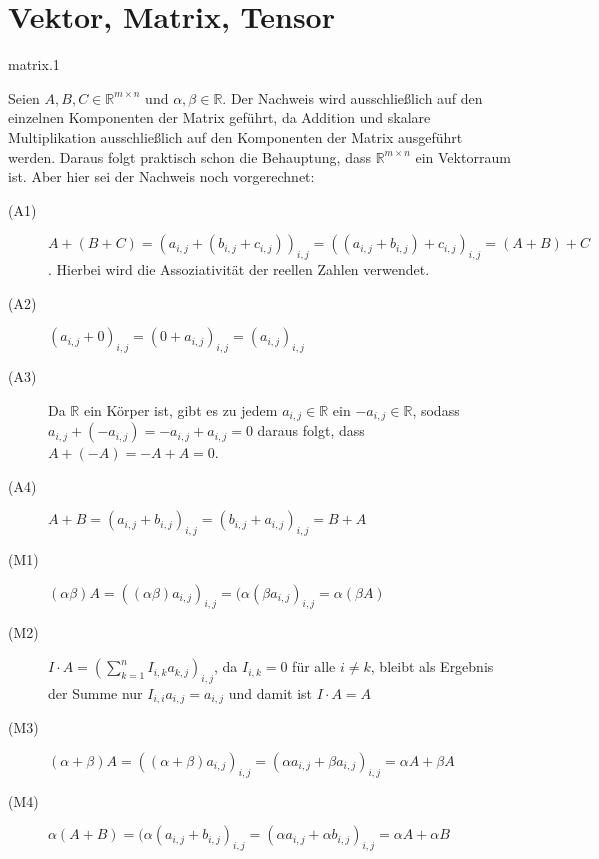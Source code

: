 \section{Vektor, Matrix, Tensor}

\begin{sol}{matrix.1}

Seien $A,B,C\in \mathbb{R}^{m\times n}$ und $\alpha , \beta \in \mathbb{R}$. Der Nachweis wird ausschließlich auf den einzelnen Komponenten der Matrix geführt, da Addition und skalare Multiplikation ausschließlich auf den Komponenten der Matrix ausgeführt werden. Daraus folgt praktisch schon die Behauptung, dass $\mathbb{R}^{m\times n}$ ein Vektorraum ist. Aber hier sei der Nachweis noch vorgerechnet:

\begin{description}
\item[(A1)] $A+(B+C) = (a_{i,j}+(b_{i,j}+c_{i,j}))_{i,j} = ((a_{i,j}+b_{i,j})+c_{i,j})_{i,j} = (A+B)+C$. Hierbei wird die Assoziativität der reellen Zahlen verwendet.
\item[(A2)] $ (a_{i,j}+0)_{i,j} = (0+a_{i,j})_{i,j} = (a_{i,j})_{i,j}$
\item[(A3)] Da $\mathbb{R}$ ein Körper ist, gibt es zu jedem $a_{i,j}\in \mathbb{R}$ ein $ -a_{i,j}\in \mathbb{R}$, sodass $a_{i,j} +(-a_{i,j}) = -a_{i,j} + a_{i,j} = 0$ daraus folgt, dass $A+(-A) = -A +A = 0$.
\item[(A4)] $ A+B = (a_{i,j}+b_{i,j})_{i,j} = (b_{i,j}+a_{i,j})_{i,j} = B+A$
\item[(M1)] $ (\alpha \beta) A = ((\alpha \beta)a_{i,j})_{i,j} = (\alpha (\beta a_{i,j})_{i,j} = \alpha (\beta A) $
\item[(M2)] $ I\cdot A = ( \sum_{k=1}^{n} I_{i,k}a_{k,j})_{i,j} $, da $I_{i,k}=0$ für alle $i\ne k$, bleibt als Ergebnis der Summe nur $I_{i,i}a_{i,j} = a_{i,j} $ und damit ist $I\cdot A = A$
\item[(M3)] $ (\alpha +\beta )A = ((\alpha + \beta)a_{i,j})_{i,j} = (\alpha a_{i,j} + \beta a_{i,j})_{i,j} = \alpha A + \beta A $
\item[(M4)] $ \alpha (A+B) = (\alpha(a_{i,j} + b_{i,j})_{i,j} = (\alpha a_{i,j} + \alpha b_{i,j})_{i,j} = \alpha A + \alpha B $
\end{description}

\end{sol}
